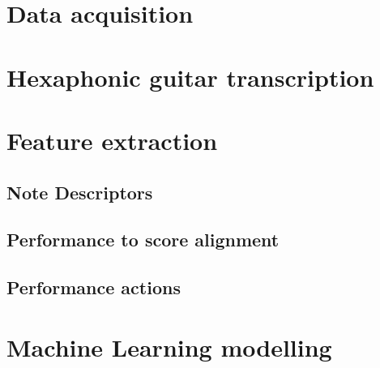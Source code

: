 \section{Data acquisition}
\section{Hexaphonic guitar transcription}


\section{Feature extraction}


\subsection{Note Descriptors}


\subsection{Performance to score alignment}
\subsection{Performance actions}
\section{Machine Learning modelling}
\cleardoublepage

